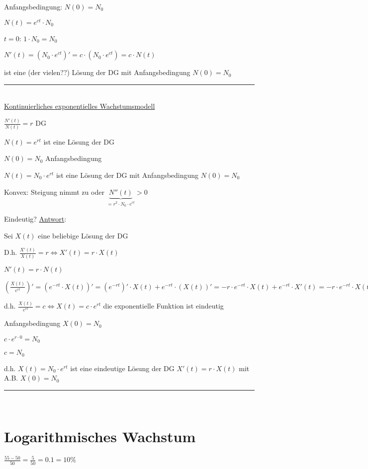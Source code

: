 \documentclass[18pt,a4paper]{scrreprt}
\newcommand{\tab}{\hspace*{2em}}
\begin{document}
Anfangsbedingung: $N(0) = N_0$

$N(t) = e^{c t} \cdot N_0$

$t = 0$: $1\cdot N_0 = N_0$ \checkmark

$N'(t) = (N_0 \cdot e^{c t})' = c\cdot(N_0 \cdot e^{c t}) = c \cdot N(t)$ \checkmark

ist eine (der vielen??) Lösung der DG mit Anfangsbedingung $N(0) = N_0$

\rule{\textwidth}{0.4mm}\\

\uline{Kontinuierliches exponentielles Wachstumsmodell}

$\frac{N'(t)}{N(t)} = r$ \tab DG

$N(t) = e^{rt}$ ist eine Lösung der DG

$N(0) = N_0$ Anfangsbedingung

$N(t) = N_0 \cdot e^{rt}$ ist eine Lösung der DG mit Anfangsbedingung $N(0) = N_0$

Konvex: Steigung nimmt zu oder $\underbrace{N''(t)}_{= r^2 \cdot N_0 \cdot e^{rt}} > 0$

Eindeutig? \uline{Antwort}: 

Sei $X(t)$ eine beliebige Lösung der DG

D.h. $\frac{X'(t)}{X(t)} = r \Leftrightarrow X'(t) = r \cdot X(t)$

\tab \tab \tab \tab $N'(t) = r \cdot N(t)$ 

$(\frac{X(t)}{e^{rt}})' = (e^{-rt} \cdot X(t))' = (e^{-rt})' \cdot X(t) + e^{-rt} \cdot (X(t))' = -r\cdot e^{-rt} \cdot X(t) + e^{-rt} \cdot X'(t) = -r\cdot e^{-rt} \cdot X(t) + e^{-rt} \cdot r\cdot X(t) = 0$

d.h. $\frac{X(t)}{e^{rt}} = c \Leftrightarrow X(t) = c\cdot e^{rt}$ die exponentielle Funktion ist eindeutig

Anfangsbedingung $X(0) = N_0$

$c \cdot e^{r\cdot 0} = N_0$

$c = N_0$

d.h. $X(t) = N_0 \cdot e^{rt}$ ist eine eindeutige Lösung der DG $X'(t) = r\cdot X(t)$ mit A.B. $X(0) = N_0$

\rule{\textwidth}{0.4mm}\\

\section{Logarithmisches Wachstum}

$\frac{55-50}{50} = \frac{5}{50} = 0.1 = 10\%$
\end{document}
